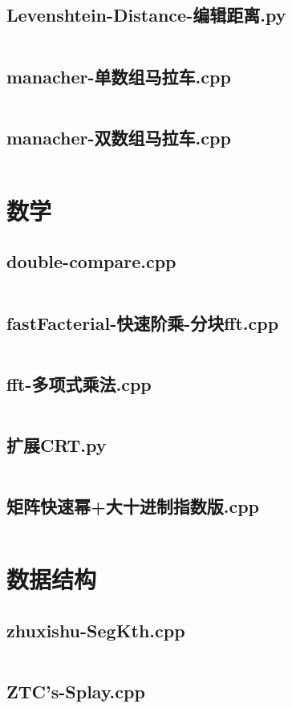 \documentclass[a4paper,landscape,twocolumn]{book} %
\begin{document}
\section{Levenshtein-Distance-编辑距离.py}
\inputminted{python}{./codes/019}
\section{manacher-单数组马拉车.cpp}
\inputminted{c++}{./codes/020}
\section{manacher-双数组马拉车.cpp}
\inputminted{c++}{./codes/021}
\chapter{数学}
\section{double-compare.cpp}
\inputminted{c++}{./codes/022}
\section{fastFacterial-快速阶乘-分块fft.cpp}
\inputminted{c++}{./codes/023}
\section{fft-多项式乘法.cpp}
\inputminted{c++}{./codes/024}
\section{扩展CRT.py}
\inputminted{python}{./codes/025}
\section{矩阵快速幂+大十进制指数版.cpp}
\inputminted{c++}{./codes/026}
\chapter{数据结构}
\section{zhuxishu-SegKth.cpp}
\inputminted{c++}{./codes/027}
\section{ZTC's-Splay.cpp}
\inputminted{c++}{./codes/028}
\end{document}
